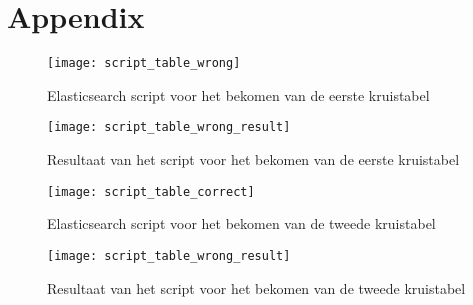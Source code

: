 \chapter{Appendix}
\label{ch:appendix}

\begin{figure}
	\centering
	\texttt{[image: script\_table\_wrong]}
	\caption{Elasticsearch script voor het bekomen van de eerste kruistabel}
	\label{app:eersteKruistabel}
\end{figure}

\begin{figure}
	\centering
	\texttt{[image: script\_table\_wrong\_result]}
	\caption{Resultaat van het script voor het bekomen van de eerste kruistabel}
	\label{app:eersteKruistabelResult}
\end{figure}

\begin{figure}
	\centering
	\texttt{[image: script\_table\_correct]}
	\caption{Elasticsearch script voor het bekomen van de tweede kruistabel}
	\label{app:tweedeKruistabel}
\end{figure}

\begin{figure}
	\centering
	\texttt{[image: script\_table\_wrong\_result]}
	\caption{Resultaat van het script voor het bekomen van de tweede kruistabel}
	\label{app:tweedeKruistabelResult}
	
\end{figure}